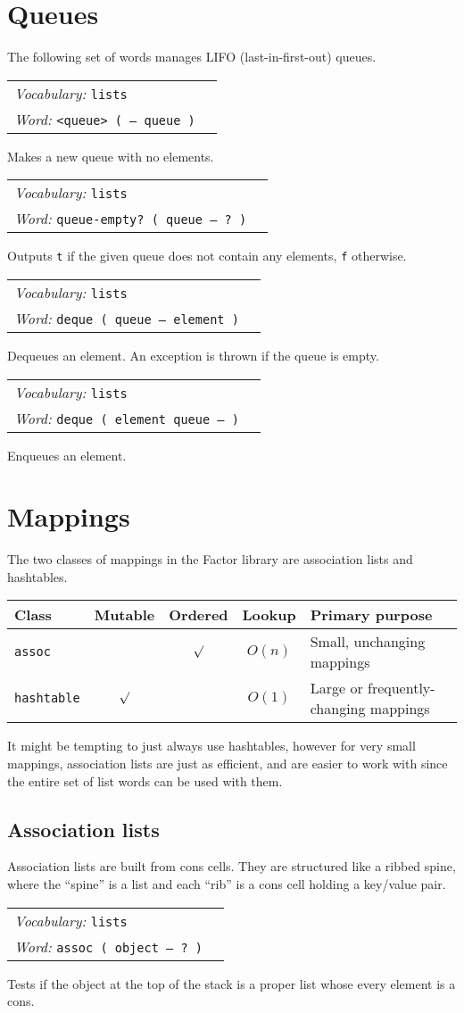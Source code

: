 \documentclass{book}
\newcommand{\vocabulary}[1]{\emph{Vocabulary:} \texttt{#1}&\\}
\newcommand{\ordinaryword}[2]{\index{\texttt{#1}}\emph{Word:} \texttt{#2}&\\}
\newcommand{\wordtable}[1]{


\begin{tabularx}{12cm}{lX}
\hline
#1
\hline
\end{tabularx}

}
\begin{document}
\section{Queues}

The following set of words manages LIFO (last-in-first-out) queues.

\wordtable{
\vocabulary{lists}
\ordinaryword{<queue>}{<queue> ( -- queue )}
}
Makes a new queue with no elements.
\wordtable{
\vocabulary{lists}
\ordinaryword{queue-empty?}{queue-empty?~( queue -- ?~)}
}
Outputs \texttt{t} if the given queue does not contain any elements, \texttt{f} otherwise.
\wordtable{
\vocabulary{lists}
\ordinaryword{deque}{deque ( queue -- element )}
}
Dequeues an element. An exception is thrown if the queue is empty.
\wordtable{
\vocabulary{lists}
\ordinaryword{enque}{deque ( element queue -- )}
}
Enqueues an element.

\section{Mappings}

The two classes of mappings in the Factor library are association lists and hashtables.

\begin{tabular}[t]{l|c|c|c|l}
Class&Mutable&Ordered&Lookup&Primary purpose\\
\hline
\texttt{assoc}&&$\surd$&$O(n)$&Small, unchanging mappings\\
\texttt{hashtable}&$\surd$&&$O(1)$&Large or frequently-changing mappings
\end{tabular}

It might be tempting to just always use hashtables, however for very small mappings, association lists are just as efficient, and are easier to work with since the entire set of list words can be used with them.

\subsection{Association lists}


Association lists are built from cons cells. They are structured like a ribbed spine, where the ``spine'' is a list and each ``rib'' is a cons cell holding a key/value pair.

\wordtable{
\vocabulary{lists}
\ordinaryword{assoc?}{assoc ( object -- ?~)}
}
Tests if the object at the top of the stack is a proper list whose every element is a cons.
\end{document}
